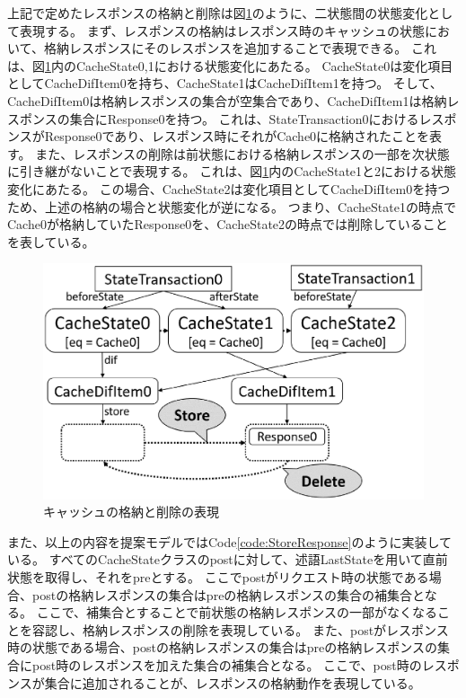 \documentclass[journal]{IEEEtran}
\begin{document}
上記で定めたレスポンスの格納と削除は図\ref{fig:ProposedModel-ResponseStoreDelete}のように、二状態間の状態変化として表現する。
まず、レスポンスの格納はレスポンス時のキャッシュの状態において、格納レスポンスにそのレスポンスを追加することで表現できる。
これは、図\ref{fig:ProposedModel-ResponseStoreDelete}内のCacheState0,1における状態変化にあたる。
CacheState0は変化項目としてCacheDifItem0を持ち、CacheState1はCacheDifItem1を持つ。
そして、CacheDifItem0は格納レスポンスの集合が空集合であり、CacheDifItem1は格納レスポンスの集合にResponse0を持つ。
これは、StateTransaction0におけるレスポンスがResponse0であり、レスポンス時にそれがCache0に格納されたことを表す。
また、レスポンスの削除は前状態における格納レスポンスの一部を次状態に引き継がないことで表現する。
これは、図\ref{fig:ProposedModel-ResponseStoreDelete}内のCacheState1と2における状態変化にあたる。
この場合、CacheState2は変化項目としてCacheDifItem0を持つため、上述の格納の場合と状態変化が逆になる。
つまり、CacheState1の時点でCache0が格納していたResponse0を、CacheState2の時点では削除していることを表している。

\begin{figure}[htb]
\centering
\includegraphics[width=\hsize]{./fig/ProposedModel-ResponseStoreDelete.eps}
\caption{キャッシュの格納と削除の表現}
\label{fig:ProposedModel-ResponseStoreDelete}
\end{figure}

また、以上の内容を提案モデルではCode\ref{code:StoreResponse}のように実装している。
すべてのCacheStateクラスのpostに対して、述語LastStateを用いて直前状態を取得し、それをpreとする。
ここでpostがリクエスト時の状態である場合、postの格納レスポンスの集合はpreの格納レスポンスの集合の補集合となる。
ここで、補集合とすることで前状態の格納レスポンスの一部がなくなることを容認し、格納レスポンスの削除を表現している。
また、postがレスポンス時の状態である場合、postの格納レスポンスの集合はpreの格納レスポンスの集合にpost時のレスポンスを加えた集合の補集合となる。
ここで、post時のレスポンスが集合に追加されることが、レスポンスの格納動作を表現している。
\end{document}
